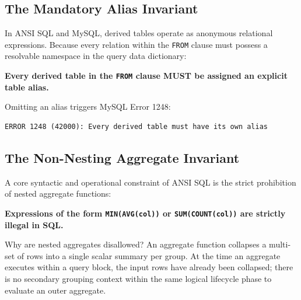 \documentclass[10pt,twocolumn,letterpaper]{article}
\begin{document}
\subsection{The Mandatory Alias Invariant}
In ANSI SQL and MySQL, derived tables operate as anonymous relational expressions. Because every relation within the \texttt{FROM} clause must possess a resolvable namespace in the query data dictionary:
\begin{center}
\textbf{Every derived table in the \texttt{FROM} clause MUST be assigned an explicit table alias.}
\end{center}
Omitting an alias triggers MySQL Error 1248:
\begin{lstlisting}[basicstyle=\ttfamily\scriptsize]
ERROR 1248 (42000): Every derived table must have its own alias
\end{lstlisting}

\subsection{The Non-Nesting Aggregate Invariant}
A core syntactic and operational constraint of ANSI SQL is the strict prohibition of nested aggregate functions:
\begin{center}
\textbf{Expressions of the form \texttt{MIN(AVG(col))} or \texttt{SUM(COUNT(col))} are strictly illegal in SQL.}
\end{center}

Why are nested aggregates disallowed? An aggregate function collapses a multi-set of rows into a single scalar summary per group. At the time an aggregate executes within a query block, the input rows have already been collapsed; there is no secondary grouping context within the same logical lifecycle phase to evaluate an outer aggregate.
\end{document}
